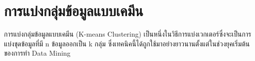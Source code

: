 \section{การแบ่งกลุ่มข้อมูลแบบเคมีน}

การแบ่งกลุ่มข้อมูลแบบเคมีน (K-means Clustering) เป็นหนึ่งในวิธีการแบ่งเวกเตอร์ซึ่งจะเป็นการแบ่งชุดข้อมูลที่มี n ข้อมูลออกเป็น k กลุ่ม
ซึ่งเทคนิคนี้ได้ถูกใช้มาอย่างยาวนานตั้งแต่ในช่วงยุคเริ่มต้นของการทำ Data Mining\cite{macqueen1967}

\begin{figure}[H]
    \centering
    \hspace{1em}
    \\
    \vspace{1em}

\end{figure}
